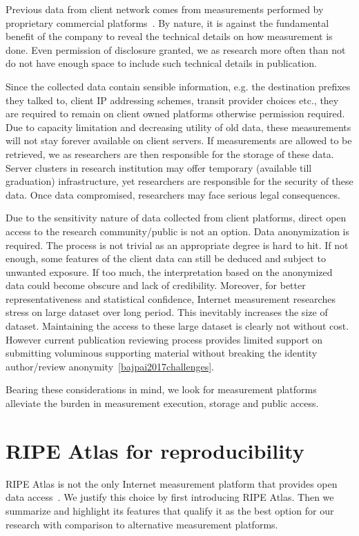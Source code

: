 Previous data from client network comes from measurements performed by proprietary commercial platforms~\cite{b6}.
By nature, it is against the fundamental benefit of the company to reveal the technical details on how measurement is done. Even permission of disclosure granted, we as research more often than not do not have enough space to include such technical details in publication.

Since the collected data contain sensible information, e.g. the destination prefixes they talked to, client IP addressing schemes, transit provider choices etc., they are required to remain on client owned platforms otherwise permission required. Due to capacity limitation and decreasing utility of old data, these measurements will not stay forever available on client servers. If measurements are allowed to be retrieved, we as researchers are then responsible for the storage of these data. Server clusters in research institution may offer temporary (available till graduation) infrastructure, yet researchers are responsible for the security of these data. Once data compromised, researchers may face serious legal consequences.

Due to the sensitivity nature of data collected from client platforms, direct open access to the research community/public is not an option. Data anonymization is required. The process is not trivial as an appropriate degree is hard to hit. If not enough, some features of the client data can still be deduced and subject to unwanted exposure. If too much, the interpretation based on the anonymized data could become obscure and lack of credibility. Moreover, for better representativeness and statistical confidence, Internet measurement researches stress on large dataset over long period. This inevitably increases the size of dataset. Maintaining the access to these large dataset is clearly not without cost. However current publication reviewing process provides limited support on submitting voluminous supporting material without breaking the identity author/review anonymity~\ref{bajpai2017challenges}.

Bearing these considerations in mind, we look for measurement platforms alleviate the burden in measurement execution, storage and public access.

\section{RIPE Atlas for reproducibility}
RIPE Atlas is not the only Internet measurement platform that provides open data access~\cite{Bajpai2015}.
We justify this choice by first introducing RIPE Atlas. Then we summarize and highlight its features that qualify it as the best option for our research with comparison to alternative measurement platforms.

